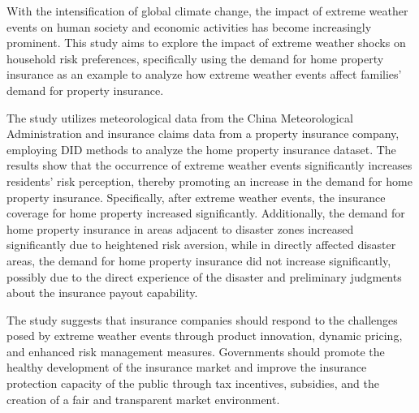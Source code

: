 \begin{eabstract}
With the intensification of global climate change, the impact of extreme weather events on human society and economic activities has become increasingly prominent. This study aims to explore the impact of extreme weather shocks on household risk preferences, specifically using the demand for home property insurance as an example to analyze how extreme weather events affect families' demand for property insurance.

The study utilizes meteorological data from the China Meteorological Administration and insurance claims data from a property insurance company, employing DID methods to analyze the home property insurance dataset. The results show that the occurrence of extreme weather events significantly increases residents' risk perception, thereby promoting an increase in the demand for home property insurance. Specifically, after extreme weather events, the insurance coverage for home property increased significantly. Additionally, the demand for home property insurance in areas adjacent to disaster zones increased significantly due to heightened risk aversion, while in directly affected disaster areas, the demand for home property insurance did not increase significantly, possibly due to the direct experience of the disaster and preliminary judgments about the insurance payout capability.

The study suggests that insurance companies should respond to the challenges posed by extreme weather events through product innovation, dynamic pricing, and enhanced risk management measures. Governments should promote the healthy development of the insurance market and improve the insurance protection capacity of the public through tax incentives, subsidies, and the creation of a fair and transparent market environment.

\end{eabstract}
